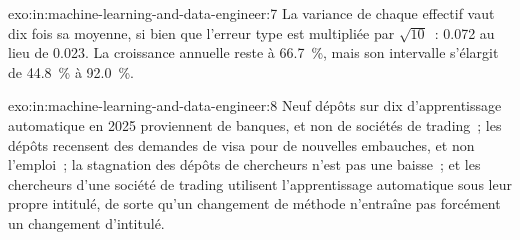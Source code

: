 \begin{solution}{exo:in:machine-learning-and-data-engineer:7}
La variance de chaque effectif vaut dix fois sa moyenne, si bien que l'erreur type est multipliée par $\sqrt{10}$~: 0.072 au lieu de 0.023. La
croissance annuelle reste à 66.7~\%, mais son intervalle s'élargit de 44.8~\% à 92.0~\%.
\end{solution}

\begin{solution}{exo:in:machine-learning-and-data-engineer:8}
Neuf dépôts sur dix d'apprentissage automatique en 2025 proviennent de banques, et non de sociétés de trading~; les dépôts
recensent des demandes de visa pour de nouvelles embauches, et non l'emploi~; la stagnation des dépôts de chercheurs n'est pas une baisse~; et les chercheurs
d'une société de trading utilisent l'apprentissage automatique sous leur propre intitulé, de sorte qu'un changement de méthode n'entraîne pas forcément un changement d'intitulé.
\end{solution}

